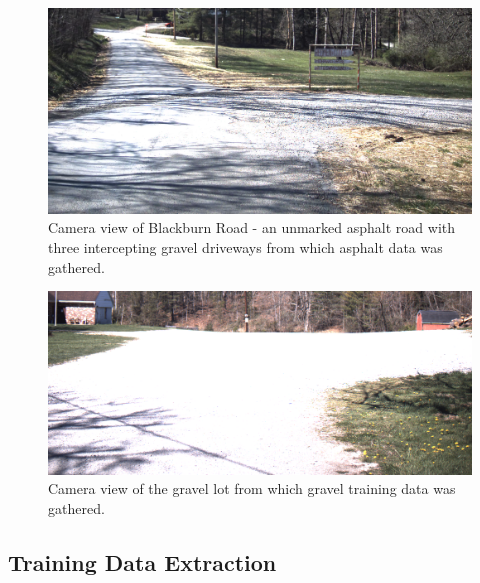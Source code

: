 \documentclass[journal,onecolumn]{IEEEtran}
\begin{document}
			\begin{figure}[H]
				\centering
				\includegraphics[width=0.75\linewidth]{figures/blackburn_road}
				\caption[Blackburn Road Camera View]{Camera view of Blackburn Road - an unmarked asphalt road with three intercepting gravel driveways from which asphalt data was gathered.}
				\label{fig:Blackburn_Road_View}
			\end{figure}
		
			\begin{figure}[H]
				\centering
				\includegraphics[width=0.75\linewidth]{figures/gravel_lot_pic}
				\caption[Gravel Training Lot]{Camera view of the gravel lot from which gravel training data was gathered.}
				\label{fig:gravel_training_lot}
			\end{figure}			
	

		\subsection{Training Data Extraction}
	
\end{document}
